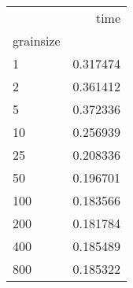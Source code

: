 \begin{tabular}{lr}
\toprule
{} &      time \\
grainsize &           \\
\midrule
1         &  0.317474 \\
2         &  0.361412 \\
5         &  0.372336 \\
10        &  0.256939 \\
25        &  0.208336 \\
50        &  0.196701 \\
100       &  0.183566 \\
200       &  0.181784 \\
400       &  0.185489 \\
800       &  0.185322 \\
\bottomrule
\end{tabular}
